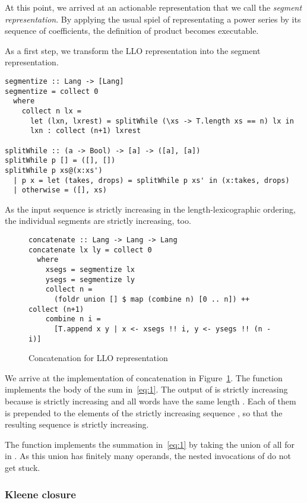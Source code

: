 At this point, we arrived at an actionable representation that we call
the \emph{segment representation}. By applying
the usual spiel of representating a power series by its sequence of
coefficients, the definition of product becomes executable.

As a first step, we transform the LLO representation into the segment
representation.
\begin{lstlisting}
segmentize :: Lang -> [Lang]
segmentize = collect 0
  where
    collect n lx =
      let (lxn, lxrest) = splitWhile (\xs -> T.length xs == n) lx in 
      lxn : collect (n+1) lxrest

splitWhile :: (a -> Bool) -> [a] -> ([a], [a])
splitWhile p [] = ([], [])
splitWhile p xs@(x:xs')
  | p x = let (takes, drops) = splitWhile p xs' in (x:takes, drops)
  | otherwise = ([], xs)
\end{lstlisting}
As the input sequence is strictly increasing in the
length-lexicographic ordering, the individual segments are strictly
increasing, too.

\begin{figure}[tp]
\begin{lstlisting}
concatenate :: Lang -> Lang -> Lang
concatenate lx ly = collect 0
  where
    xsegs = segmentize lx
    ysegs = segmentize ly
    collect n =
      (foldr union [] $ map (combine n) [0 .. n]) ++ collect (n+1)
    combine n i =
      [T.append x y | x <- xsegs !! i, y <- ysegs !! (n - i)]
\end{lstlisting}
  \caption{Concatenation for LLO representation}
  \label{fig:concatenate-with-segments}
\end{figure}
We arrive at the implementation of concatenation in Figure~\ref{fig:concatenate-with-segments}.
The function  implements the body of the sum
in~\eqref{eq:1}. The output of  is strictly increasing
because  is strictly increasing and all words have the same length .
Each of them is prepended to the elements of the strictly increasing
sequence , so that the resulting sequence is
strictly increasing.

The function  implements the summation in~\eqref{eq:1}
by taking the union of all  for  in \code{[0
.. n]}. As this union has finitely many operands, the nested
invocations of  do not get stuck.

\subsubsection{Kleene closure}

